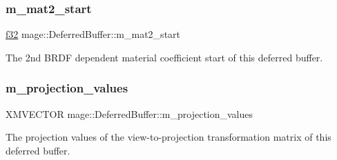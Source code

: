 \subsubsection{\texorpdfstring{m\+\_\+mat2\+\_\+start}{m\_mat2\_start}}
{\footnotesize\ttfamily \hyperlink{namespacemage_a6a44ad388483959dc4dff9f2aef91431}{f32} mage\+::\+Deferred\+Buffer\+::m\+\_\+mat2\+\_\+start}

The 2nd B\+R\+DF dependent material coefficient start of this deferred buffer. \hypertarget{structmage_1_1_deferred_buffer_a7af6a3b361e4cfa5c29349b4a6b2823b}{}\label{structmage_1_1_deferred_buffer_a7af6a3b361e4cfa5c29349b4a6b2823b} 
\subsubsection{\texorpdfstring{m\+\_\+projection\+\_\+values}{m\_projection\_values}}
{\footnotesize\ttfamily X\+M\+V\+E\+C\+T\+OR mage\+::\+Deferred\+Buffer\+::m\+\_\+projection\+\_\+values}

The projection values of the view-\/to-\/projection transformation matrix of this deferred buffer. 